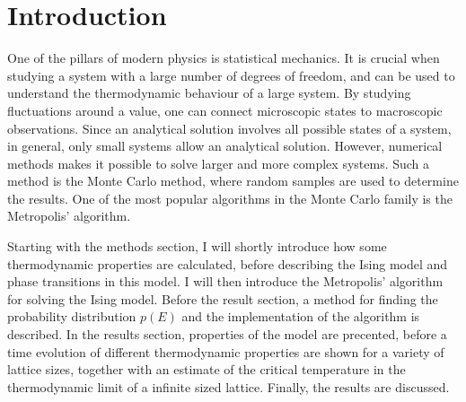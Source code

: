 \section{Introduction}
\label{sec:introduction}
One of the pillars of modern physics is statistical mechanics. It is crucial when studying a system with a large number of degrees of freedom, and can be used to understand the thermodynamic behaviour of a large system. By studying fluctuations around a value, one can connect microscopic states to macroscopic observations. Since an analytical solution involves all possible states of a system, in general, only small systems allow an analytical solution. However, numerical methods makes it possible to solve larger and more complex systems. Such a method is the Monte Carlo method, where random samples are used to determine the results. One of the most popular algorithms in the Monte Carlo family is the Metropolis' algorithm. 

Starting with the methods section, I will shortly introduce how some thermodynamic properties are calculated, before describing the Ising model and phase transitions in this model. I will then introduce the Metropolis' algorithm for solving the Ising model. Before the result section, a method for finding the probability distribution $p(E)$ and the implementation of the algorithm is described. In the results section, properties of the model are precented, before a time evolution of different thermodynamic properties are shown for a variety of lattice sizes, together with an estimate of the critical temperature in the thermodynamic limit of a infinite sized lattice. Finally, the results are discussed.    